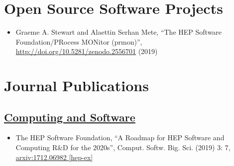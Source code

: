 \documentclass[a4paper,10pt]{article}
\begin{document}
\section{Open Source Software Projects}
\begin{itemize}
	\item Graeme A. Stewart and Alaettin Serhan Mete,
	``The HEP Software Foundation/PRocess MONitor (prmon)'',
	\href{http://doi.org/10.5281/zenodo.2556701}{http://doi.org/10.5281/zenodo.2556701} (2019)
\end{itemize}

\section{Journal Publications}
\vspace{1mm}
\subsection{\underline{Computing and Software}}
\vspace{1mm}
\begin{itemize}
	\item The HEP Software Foundation, 
	``A Roadmap for HEP Software and Computing R\&D for the 2020s'',
	Comput. Softw. Big. Sci. (2019) 3: 7,
	\href{https://arxiv.org/abs/1712.06982}{arxiv:1712.06982 [hep-ex]}
\end{itemize}
\vspace{1mm}
\end{document}
